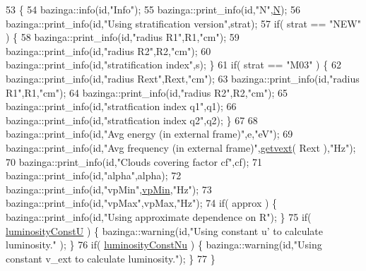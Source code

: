 \begin{DoxyCode}
53                            \{
54   bazinga::info(\textcolor{keywordtype}{id},\textcolor{stringliteral}{"Info"});
55   bazinga::print\_info(\textcolor{keywordtype}{id},\textcolor{stringliteral}{"N"},\hyperlink{classbaseClass_a2b4d07d2b46197d495de0477f4bb22f8}{N});
56   bazinga::print\_info(\textcolor{keywordtype}{id},\textcolor{stringliteral}{"Using stratification version"},strat);
57   \textcolor{keywordflow}{if}( strat == \textcolor{stringliteral}{"NEW"} ) \{
58     bazinga::print\_info(\textcolor{keywordtype}{id},\textcolor{stringliteral}{"radius R1"},R1,\textcolor{stringliteral}{"cm"});
59     bazinga::print\_info(\textcolor{keywordtype}{id},\textcolor{stringliteral}{"radius R2"},R2,\textcolor{stringliteral}{"cm"});
60     bazinga::print\_info(\textcolor{keywordtype}{id},\textcolor{stringliteral}{"stratification index"},s); \}
61   \textcolor{keywordflow}{if}( strat == \textcolor{stringliteral}{"M03"} ) \{
62     bazinga::print\_info(\textcolor{keywordtype}{id},\textcolor{stringliteral}{"radius Rext"},Rext,\textcolor{stringliteral}{"cm"});
63     bazinga::print\_info(\textcolor{keywordtype}{id},\textcolor{stringliteral}{"radius R1"},R1,\textcolor{stringliteral}{"cm"});
64     bazinga::print\_info(\textcolor{keywordtype}{id},\textcolor{stringliteral}{"radius R2"},R2,\textcolor{stringliteral}{"cm"});
65     bazinga::print\_info(\textcolor{keywordtype}{id},\textcolor{stringliteral}{"stratfication index q1"},q1);
66     bazinga::print\_info(\textcolor{keywordtype}{id},\textcolor{stringliteral}{"stratfication index q2"},q2); \}
67   
68   bazinga::print\_info(\textcolor{keywordtype}{id},\textcolor{stringliteral}{"Avg energy (in external frame)"},e,\textcolor{stringliteral}{"eV"});
69   bazinga::print\_info(\textcolor{keywordtype}{id},\textcolor{stringliteral}{"Avg frequency (in external frame)"},\hyperlink{classBlrPlanar_abe8831b3b2d9ea5d632a354f1305bf86}{getvext}( Rext ),\textcolor{stringliteral}{"Hz"});
70   bazinga::print\_info(\textcolor{keywordtype}{id},\textcolor{stringliteral}{"Clouds covering factor cf"},cf);
71   bazinga::print\_info(\textcolor{keywordtype}{id},\textcolor{stringliteral}{"alpha"},alpha);
72   bazinga::print\_info(\textcolor{keywordtype}{id},\textcolor{stringliteral}{"vpMin"},\hyperlink{classenergyDissProc_aafedd3c012010a8e8aa34247660fea3b}{vpMin},\textcolor{stringliteral}{"Hz"});
73   bazinga::print\_info(\textcolor{keywordtype}{id},\textcolor{stringliteral}{"vpMax"},vpMax,\textcolor{stringliteral}{"Hz"});
74   \textcolor{keywordflow}{if}( approx ) \{ bazinga::print\_info(\textcolor{keywordtype}{id},\textcolor{stringliteral}{"Using approximate dependence on R"}); \}
75   \textcolor{keywordflow}{if}( \hyperlink{classenergyDissProc_a2cc4e4eae15982f977a0dfa5458d80f4}{luminosityConstU} ) \{ bazinga::warning(\textcolor{keywordtype}{id},\textcolor{stringliteral}{"Using constant u' to calculate luminosity."}
      ); \}
76   \textcolor{keywordflow}{if}( \hyperlink{classenergyDissProc_a0a23854c1c830dfb9ac33d116fce5b7d}{luminosityConstNu} ) \{ bazinga::warning(\textcolor{keywordtype}{id},\textcolor{stringliteral}{"Using constant v\_ext to calculate
       luminosity."}); \}
77 \}
\end{DoxyCode}
